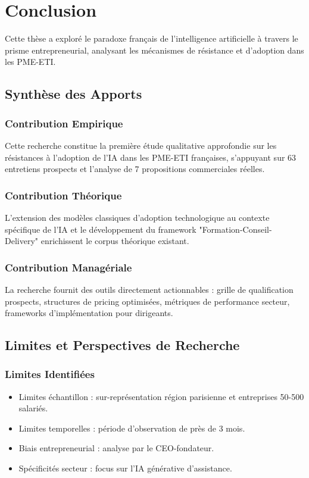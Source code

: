 \chapter{Conclusion}
\label{chap:conclusion}

Cette thèse a exploré le paradoxe français de l'intelligence artificielle à travers le prisme entrepreneurial, analysant les mécanismes de résistance et d'adoption dans les PME-ETI.

\section{Synthèse des Apports}

\subsection{Contribution Empirique}
Cette recherche constitue la première étude qualitative approfondie sur les résistances à l'adoption de l'IA dans les PME-ETI françaises, s'appuyant sur 63 entretiens prospects et l'analyse de 7 propositions commerciales réelles.

\subsection{Contribution Théorique}
L'extension des modèles classiques d'adoption technologique au contexte spécifique de l'IA et le développement du framework "Formation-Conseil-Delivery" enrichissent le corpus théorique existant.

\subsection{Contribution Managériale}
La recherche fournit des outils directement actionnables : grille de qualification prospects, structures de pricing optimisées, métriques de performance secteur, frameworks d'implémentation pour dirigeants.

\section{Limites et Perspectives de Recherche}

\subsection{Limites Identifiées}
\begin{itemize}
    \item Limites échantillon : sur-représentation région parisienne et entreprises 50-500 salariés.
    \item Limites temporelles : période d'observation de près de 3 mois.
    \item Biais entrepreneurial : analyse par le CEO-fondateur.
    \item Spécificités secteur : focus sur l'IA générative d'assistance.
\end{itemize}

